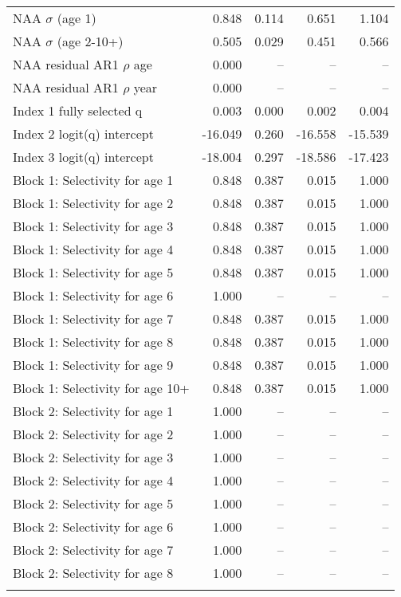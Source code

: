 \documentclass[
]{article}
\begin{document}
\begin{landscape}
\begin{longtable}[t]{lrrrr}
\endfoot
\bottomrule
\endlastfoot
NAA $\sigma$ (age 1) & 0.848 & 0.114 & 0.651 & 1.104\\
NAA $\sigma$ (age 2-10+) & 0.505 & 0.029 & 0.451 & 0.566\\
NAA residual AR1 $\rho$ age & 0.000 & -- & -- & --\\
NAA residual AR1 $\rho$ year & 0.000 & -- & -- & --\\
Index 1 fully selected q & 0.003 & 0.000 & 0.002 & 0.004\\
\addlinespace
Index 2 logit(q) intercept & -16.049 & 0.260 & -16.558 & -15.539\\
Index 3 logit(q) intercept & -18.004 & 0.297 & -18.586 & -17.423\\
Block 1: Selectivity for age 1 & 0.848 & 0.387 & 0.015 & 1.000\\
Block 1: Selectivity for age 2 & 0.848 & 0.387 & 0.015 & 1.000\\
Block 1: Selectivity for age 3 & 0.848 & 0.387 & 0.015 & 1.000\\
\addlinespace
Block 1: Selectivity for age 4 & 0.848 & 0.387 & 0.015 & 1.000\\
Block 1: Selectivity for age 5 & 0.848 & 0.387 & 0.015 & 1.000\\
Block 1: Selectivity for age 6 & 1.000 & -- & -- & --\\
Block 1: Selectivity for age 7 & 0.848 & 0.387 & 0.015 & 1.000\\
Block 1: Selectivity for age 8 & 0.848 & 0.387 & 0.015 & 1.000\\
\addlinespace
Block 1: Selectivity for age 9 & 0.848 & 0.387 & 0.015 & 1.000\\
Block 1: Selectivity for age 10+ & 0.848 & 0.387 & 0.015 & 1.000\\
Block 2: Selectivity for age 1 & 1.000 & -- & -- & --\\
Block 2: Selectivity for age 2 & 1.000 & -- & -- & --\\
Block 2: Selectivity for age 3 & 1.000 & -- & -- & --\\
\addlinespace
Block 2: Selectivity for age 4 & 1.000 & -- & -- & --\\
Block 2: Selectivity for age 5 & 1.000 & -- & -- & --\\
Block 2: Selectivity for age 6 & 1.000 & -- & -- & --\\
Block 2: Selectivity for age 7 & 1.000 & -- & -- & --\\
Block 2: Selectivity for age 8 & 1.000 & -- & -- & --\\
\addlinespace

\end{longtable}
\end{landscape}
\end{document}
